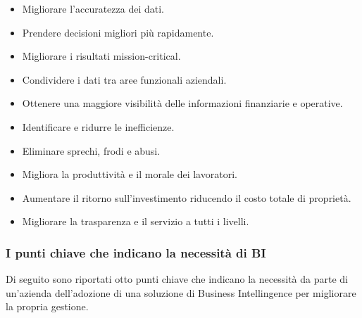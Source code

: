 \begin{itemize}
    \item Migliorare l'accuratezza dei dati.
    \item Prendere decisioni migliori più rapidamente.
    \item Migliorare i risultati mission-critical.
    \item Condividere i dati tra aree funzionali aziendali.
    \item Ottenere una maggiore visibilità delle informazioni finanziarie e operative.
    \item Identificare e ridurre le inefficienze.
    \item Eliminare sprechi, frodi e abusi.
    \item Migliora la produttività e il morale dei lavoratori.
    \item Aumentare il ritorno sull'investimento riducendo il costo totale di proprietà.
    \item Migliorare la trasparenza e il servizio a tutti i livelli.
\end{itemize}

\subsubsection{I punti chiave che indicano la necessità di BI}

Di seguito sono riportati otto punti chiave che indicano la necessità da parte di un'azienda dell'adozione di una soluzione di Business Intellingence per migliorare la propria gestione.\cite{boomper_book_of_bi}

